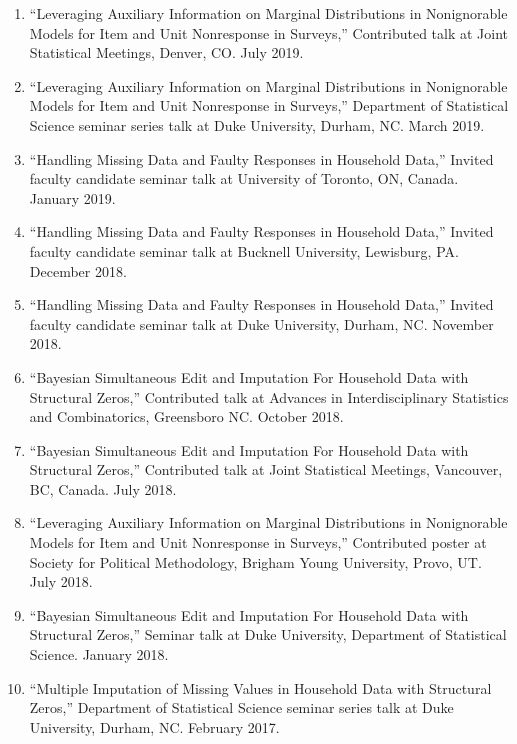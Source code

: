 \documentclass[12pt]{article}
\begin{document}
{\begin{enumerate}[noitemsep,topsep=3pt]
	\item ``Leveraging Auxiliary Information on Marginal Distributions in Nonignorable Models for Item and Unit Nonresponse in Surveys,'' Contributed talk at Joint Statistical Meetings, Denver, CO. July 2019.
	
	\item ``Leveraging Auxiliary Information on Marginal Distributions in Nonignorable Models for Item and Unit Nonresponse in Surveys,'' Department of Statistical Science seminar series talk at Duke University, Durham, NC. March 2019.
	
	\item ``Handling Missing Data and Faulty Responses in Household Data,'' Invited faculty candidate seminar talk at University of Toronto, ON, Canada. January 2019.
	
	\item ``Handling Missing Data and Faulty Responses in Household Data,'' Invited faculty candidate seminar talk at Bucknell University, Lewisburg, PA. December 2018.
	
	\item ``Handling Missing Data and Faulty Responses in Household Data,'' Invited faculty candidate seminar talk at Duke University, Durham, NC. November 2018.
	
	\item ``Bayesian Simultaneous Edit and Imputation For Household Data with Structural Zeros,'' Contributed talk at Advances in Interdisciplinary Statistics and Combinatorics, Greensboro NC. October 2018.
	
	\item ``Bayesian Simultaneous Edit and Imputation For Household Data with Structural Zeros,'' Contributed talk at Joint Statistical Meetings, Vancouver, BC, Canada. July 2018.
	
	\item ``Leveraging Auxiliary Information on Marginal Distributions in Nonignorable Models for Item and Unit Nonresponse in Surveys,'' Contributed poster at Society for Political Methodology, Brigham Young University, Provo, UT. July 2018.
	
	\item ``Bayesian Simultaneous Edit and Imputation For Household Data with Structural Zeros,'' Seminar talk at Duke University, Department of Statistical Science. January 2018.
	
	\item ``Multiple Imputation of Missing Values in Household Data with Structural Zeros,'' Department of Statistical Science seminar series talk at Duke University, Durham, NC. February 2017.
\end{enumerate}



}
\end{document}
